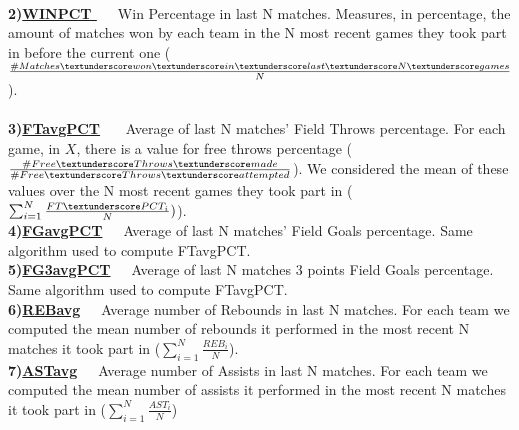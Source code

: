 \documentclass{article}
\begin{document}
\\
\textbf{2)\underline{WIN\textunderscore PCT }}\ \ \  Win Percentage in last N matches. Measures, in percentage, the amount of matches won by each team in the N most recent games they took part in before the current one ($\frac{\# Matches\textunderscore won\textunderscore in\textunderscore last\textunderscore N\textunderscore games}{N}$).
\\ 
\\
\textbf{3)\underline{FT\textunderscore avg\textunderscore PCT}} \ \ \ Average of last N matches' Field Throws percentage. For each game, in $X$, there is a value for free throws percentage ($\frac{\# Free\textunderscore Throws\textunderscore made}{\# Free\textunderscore Throws\textunderscore attempted}$). We considered the mean of these values over the N most recent games they took part in ($\sum_{i=1}^{N}  \frac{FT\textunderscore PCT_{i}}{N})$).  
\\
\textbf{4)\underline{FG\textunderscore avg\textunderscore PCT}}\ \ \ Average of last N matches' Field Goals percentage. Same algorithm used to compute FT\textunderscore avg\textunderscore PCT.  
\\
\textbf{5)\underline{FG3\textunderscore avg\textunderscore PCT}}\ \ \ Average of last N matches 3 points Field Goals percentage. Same algorithm used to compute FT\textunderscore avg\textunderscore PCT. 
\\
\textbf{6)\underline{REB\textunderscore avg}}\ \ \ Average number of Rebounds in last N matches. For each team we computed the mean number of rebounds it performed in the most recent N matches it took part in ($\sum_{i=1}^{N}  \frac{REB_{i}}{N}$). 
\\
\textbf{7)\underline{AST\textunderscore avg}}\ \ \ Average number of Assists in last N matches. For each team we computed the mean number of assists it performed in the most recent N matches it took part in ($\sum_{i=1}^{N}  \frac{AST_{i}}{N}$) 
\\

\end{document}
